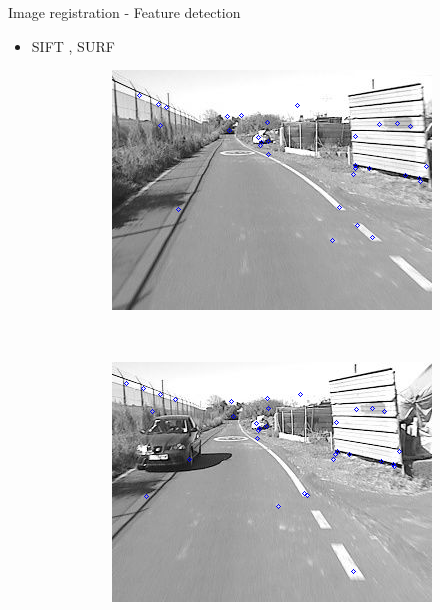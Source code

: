 \begin{frame}{Image registration - Feature detection}
\begin{itemize}
\begin{center}
\begin{figure}[h!]
\begin{subfigure}[b]{0.45\textwidth}
	\end{subfigure}%
      \end{figure}
    \end{center}
    \item SIFT \citep{lowe1999object}, SURF \citep{bay2008speeded}\\
    \begin{center}
      \begin{figure}[h!]
	\centering
	\begin{subfigure}[b]{0.45\textwidth}
		\includegraphics[height=0.3\textheight]{featuresSIFT1}
	\end{subfigure}%
	~
	\begin{subfigure}[b]{0.45\textwidth}
		\includegraphics[height=0.3\textheight]{featuresSIFT2}
	\end{subfigure}%
      \end{figure}
    \end{center}
  \end{itemize}

  \note {
  
  }
\end{frame}


